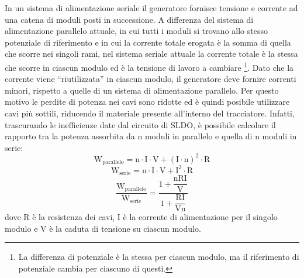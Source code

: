 In un sistema di alimentazione seriale il generatore fornisce tensione e corrente ad una catena di moduli posti in successione. 
A differenza del sistema di alimentazione parallelo attuale, in cui tutti i moduli si trovano allo stesso potenziale di riferimento e in cui la corrente totale erogata è la somma di quella che scorre nei singoli rami, nel sistema seriale attuale la corrente totale è la stessa che scorre in ciascun modulo ed è la tensione di lavoro a cambiare
\footnote{
  La differenza di potenziale è la stessa per ciascun modulo, ma il riferimento di potenziale cambia per ciascuno di questi.
}.
Dato che la corrente viene ``riutilizzata'' in ciascun modulo, il generatore deve fornire correnti minori, rispetto a quelle di un sistema di alimentazione parallelo.
Per questo motivo le perdite di potenza nei cavi sono ridotte ed è quindi posibile utilizzare cavi più sottili, riducendo il materiale presente all'interno del tracciatore.
Infatti, trascurando le inefficienze date dal circuito di SLDO, è possibile calcolare il rapporto tra la potenza assorbita da n moduli in parallelo e quella di n moduli in serie:
\begin{equation}
\mathrm{W_{parallelo} = n \cdot I \cdot V + (I\cdot n)^2 \cdot R}
\end{equation}
\begin{equation}
\mathrm{W_{serie} = n \cdot I \cdot V + I^2 \cdot R}
\end{equation}
\begin{equation}
\mathrm{\frac{W_{parallelo}}{W_{serie}} = \frac{1+ \dfrac{nRI}{V}}{1+\dfrac{RI}{Vn}}}
\end{equation}
dove R è la resistenza dei cavi, I è la corrente di alimentazione per il singolo modulo e V è la caduta di tensione su ciascun modulo. 

